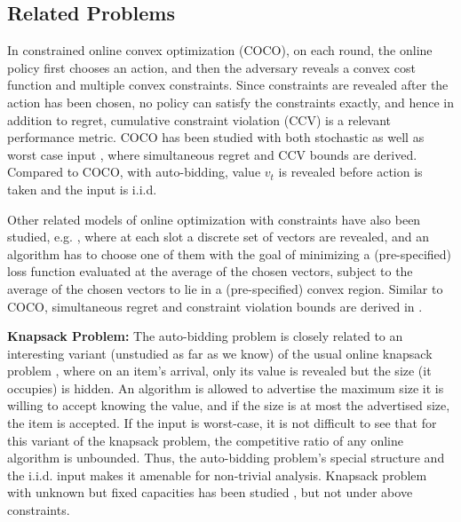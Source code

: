 \subsection{Related Problems} 
In constrained online convex optimization (COCO), on each round, the online policy first chooses an action, and then the adversary reveals a convex cost function and multiple convex constraints. Since constraints are revealed after the action has been chosen, no policy can satisfy the constraints exactly, and hence
in addition to regret, cumulative constraint violation (CCV) is a relevant performance metric. COCO has been studied with both 
 stochastic \cite{mannor2009online, mahdavi2013stochastic, yu2017online, badanidiyuru2018bandits} as well as worst case input \cite{yu2016low, guo2022online, sinha2024optimalalgorithmsonlineconvex}, where simultaneous regret and CCV bounds are derived.
Compared to COCO, with auto-bidding,  value $v_t$ is revealed before action is taken and the input is i.i.d.
 
 Other related models of online optimization with constraints have also been studied, e.g. \cite{agrawal2014fast}, where at each slot a discrete set of vectors are revealed, and an algorithm has to choose one of them with the goal of minimizing a (pre-specified) loss function evaluated at the average of the chosen vectors, subject to the average of the chosen vectors to lie in a (pre-specified) convex region. Similar to COCO, simultaneous regret and constraint violation bounds are derived in \cite{agrawal2014fast}.
 
{\bf Knapsack Problem:} The auto-bidding problem is closely related to an interesting variant (unstudied as far as we know) of the usual online knapsack problem \cite{vaze2023online}, where on an item's arrival, only its value is revealed 
but the size (it occupies) is hidden. An algorithm is allowed to advertise the maximum size it is willing to accept knowing the value, and if the size is at most the advertised size, the item is accepted.
If the input is worst-case, it is not difficult to see that for this variant of the knapsack problem, the competitive ratio of any online algorithm is unbounded. Thus, the auto-bidding problem's special structure and the i.i.d. input makes it amenable for non-trivial analysis. Knapsack problem with unknown but fixed capacities has been studied \cite{disser2017packing}, but not under  above constraints. 

